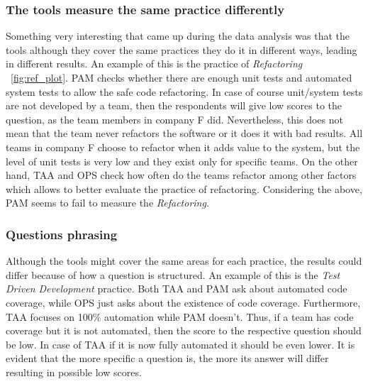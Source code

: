 \subsubsection{The tools measure the same practice differently}
Something very interesting that came up during the data analysis was that the tools although they cover the same practices they do it in different ways, leading in different results. An example of this is the practice of \textit{Refactoring} ~\ref{fig:ref_plot}. PAM checks whether there are enough unit tests and automated system tests to allow the safe code refactoring. In case of course unit/system tests are not developed by a team, then the respondents will give low scores to the question, as the team members in company F did. Nevertheless, this does not mean that the team never refactors the software or it does it with bad results. All teams in company F choose to refactor when it adds value to the system, but the level of unit tests is very low and they exist only for specific teams. On the other hand, TAA and OPS check how often do the teams refactor among other factors which allows to better evaluate the practice of refactoring. Considering the above, PAM seems to fail to measure the \textit{Refactoring}.

\subsubsection{Questions phrasing}
Although the tools might cover the same areas for each practice, the results could differ because of how a question is structured. An example of this is the \textit{Test Driven Development} practice. Both TAA and PAM ask about automated code coverage, while OPS just asks about the existence of code coverage. Furthermore, TAA focuses on 100\% automation while PAM doesn’t. Thus, if a team has code coverage but it is not automated, then the score to the respective question should be low. In case of TAA if it is now fully automated it should be even lower. It is evident that the more specific a question is, the more its answer will differ resulting in possible low scores.
